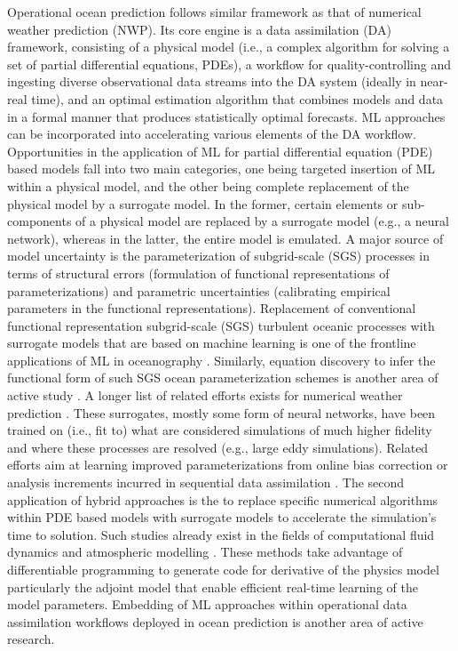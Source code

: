 \documentclass{article}
\begin{document}
Operational ocean prediction follows similar framework as that of numerical weather prediction (NWP). Its core engine is a data assimilation (DA) framework, consisting of a physical model (i.e., a complex algorithm for solving a set of partial differential equations, PDEs), a workflow for quality-controlling and ingesting diverse observational data streams into the DA system (ideally in near-real time), and an optimal estimation algorithm that combines models and data in a formal manner that produces statistically optimal forecasts. ML approaches can be incorporated into accelerating various elements of the DA workflow. Opportunities in the application of ML for partial differential equation (PDE) based models fall into two main categories, one being targeted insertion of ML within a physical model, and the other being complete replacement of the physical model by a surrogate model. In the former, certain elements or sub-components of a physical model are replaced by a surrogate model (e.g., a neural network), whereas in the latter, the entire model is emulated. A major source of model uncertainty is the parameterization of subgrid-scale (SGS) processes in terms of structural errors (formulation of functional representations of parameterizations) and parametric uncertainties (calibrating empirical parameters in the functional representations). Replacement of conventional functional representation subgrid-scale (SGS) turbulent oceanic processes with surrogate models that are based on machine learning is one of the frontline applications of ML in oceanography \citep{zanna2025framework, bodner2025data, sane2023parameterizing}. Similarly, equation discovery to infer the functional form of such SGS ocean parameterization schemes is another area of active study \citep{zanna2020data, perezhogin2023implementation}. A longer list of related efforts exists for numerical weather prediction \citep{ben2024rise, dueben2021deep}. These surrogates, mostly some form of neural networks, have been trained on (i.e., fit to) what are considered simulations of much higher fidelity and where these processes are resolved (e.g., large eddy simulations). Related efforts aim at learning improved parameterizations from online bias correction or analysis increments incurred in sequential data assimilation \citep{gregory2023deep, gregory2024machine, storto2024correction}. The second application of hybrid approaches is the to replace specific numerical algorithms within PDE based models with surrogate models to accelerate the simulation's time to solution. Such studies already exist in the fields of computational fluid dynamics \citep{kochkov2021machine} and atmospheric modelling \citep{arcomano2023hybrid}. These methods take advantage of differentiable programming to generate code for derivative of the physics model particularly the adjoint model that enable efficient real-time learning of the model parameters. Embedding of ML approaches within operational data assimilation workflows deployed in ocean prediction is another area of active research. 
\end{document}
